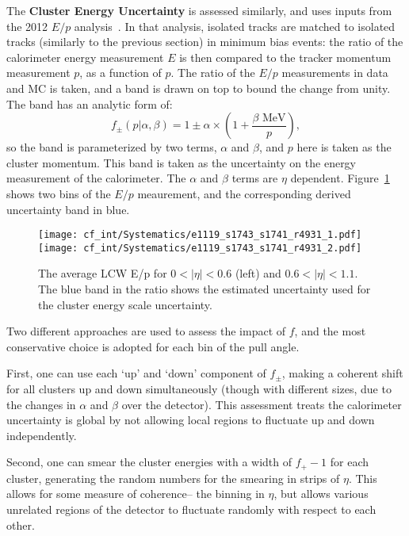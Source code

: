 	The \textbf{Cluster Energy Uncertainty} is assessed similarly, and uses inputs from the 2012 $E/p$ analysis~. In that analysis, isolated tracks are matched to isolated tracks (similarly to the previous section) in minimum bias events: the ratio of the calorimeter energy measurement $E$ is then compared to the tracker momentum measurement $p$, as a function of $p$. The ratio of the $E/p$ measurements in data and MC is taken, and a band is drawn on top to bound the change from unity. The band has an analytic form of:
	\begin{equation}
	f_\pm(p|\alpha,\beta)= 1\pm \alpha \times\left(1+\frac{\beta\text{ MeV}}{p}\right),
	\end{equation}
	so the band is parameterized by two terms, $\alpha$ and $\beta$, and $p$ here is taken as the cluster momentum. This band is taken as the uncertainty on the energy measurement of the calorimeter. The $\alpha$ and $\beta$ terms are $\eta$ dependent. Figure~\ref{fig:color:uncertainties:clusters:ep} shows two bins of the $E/p$ meaurement, and the corresponding derived uncertainty band in blue.


\begin{figure}[h!]
\begin{center}
\texttt{[image: cf\_int/Systematics/e1119\_s1743\_s1741\_r4931\_1.pdf]}\texttt{[image: cf\_int/Systematics/e1119\_s1743\_s1741\_r4931\_2.pdf]}
\end{center}
\caption{The average LCW E/p for $0<|\eta|<0.6$ (left) and $0.6<|\eta|<1.1$. The blue band in the ratio shows the estimated uncertainty used for the cluster energy scale uncertainty.}
\label{fig:color:uncertainties:clusters:ep}
\end{figure}

	Two different approaches are used to assess the impact of $f$, and the most conservative choice is adopted for each bin of the pull angle.

	First, one can use each `up' and `down' component of $f_\pm$, making a coherent shift for all clusters up and down simultaneously (though with different sizes, due to the changes in $\alpha$ and $\beta$ over the detector). This assessment treats the calorimeter uncertainty is global by not allowing local regions to fluctuate up and down independently.

	Second, one can smear the cluster energies with a width of $f_+ - 1$ for each cluster, generating the random numbers for the smearing in strips of $\eta$. This allows for some measure of coherence-- the binning in $\eta$, but allows various unrelated regions of the detector to fluctuate randomly with respect to each other.

